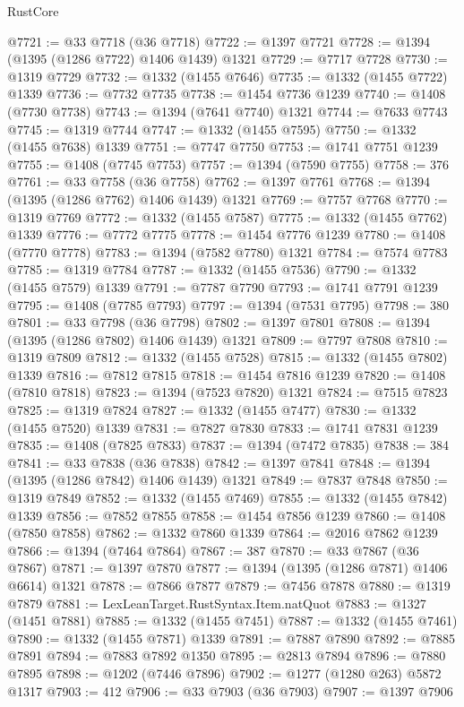 \begin{lexlean}{RustCore}
\begin{coremodule}
@7721 := @33 @7718 (@36 @7718)
@7722 := @1397 @7721
@7728 := @1394 (@1395 (@1286 @7722) @1406 @1439) @1321
@7729 := @7717 @7728
@7730 := @1319 @7729
@7732 := @1332 (@1455 @7646)
@7735 := @1332 (@1455 @7722) @1339
@7736 := @7732 @7735
@7738 := @1454 @7736 @1239
@7740 := @1408 (@7730 @7738)
@7743 := @1394 (@7641 @7740) @1321
@7744 := @7633 @7743
@7745 := @1319 @7744
@7747 := @1332 (@1455 @7595)
@7750 := @1332 (@1455 @7638) @1339
@7751 := @7747 @7750
@7753 := @1741 @7751 @1239
@7755 := @1408 (@7745 @7753)
@7757 := @1394 (@7590 @7755)
@7758 := 376
@7761 := @33 @7758 (@36 @7758)
@7762 := @1397 @7761
@7768 := @1394 (@1395 (@1286 @7762) @1406 @1439) @1321
@7769 := @7757 @7768
@7770 := @1319 @7769
@7772 := @1332 (@1455 @7587)
@7775 := @1332 (@1455 @7762) @1339
@7776 := @7772 @7775
@7778 := @1454 @7776 @1239
@7780 := @1408 (@7770 @7778)
@7783 := @1394 (@7582 @7780) @1321
@7784 := @7574 @7783
@7785 := @1319 @7784
@7787 := @1332 (@1455 @7536)
@7790 := @1332 (@1455 @7579) @1339
@7791 := @7787 @7790
@7793 := @1741 @7791 @1239
@7795 := @1408 (@7785 @7793)
@7797 := @1394 (@7531 @7795)
@7798 := 380
@7801 := @33 @7798 (@36 @7798)
@7802 := @1397 @7801
@7808 := @1394 (@1395 (@1286 @7802) @1406 @1439) @1321
@7809 := @7797 @7808
@7810 := @1319 @7809
@7812 := @1332 (@1455 @7528)
@7815 := @1332 (@1455 @7802) @1339
@7816 := @7812 @7815
@7818 := @1454 @7816 @1239
@7820 := @1408 (@7810 @7818)
@7823 := @1394 (@7523 @7820) @1321
@7824 := @7515 @7823
@7825 := @1319 @7824
@7827 := @1332 (@1455 @7477)
@7830 := @1332 (@1455 @7520) @1339
@7831 := @7827 @7830
@7833 := @1741 @7831 @1239
@7835 := @1408 (@7825 @7833)
@7837 := @1394 (@7472 @7835)
@7838 := 384
@7841 := @33 @7838 (@36 @7838)
@7842 := @1397 @7841
@7848 := @1394 (@1395 (@1286 @7842) @1406 @1439) @1321
@7849 := @7837 @7848
@7850 := @1319 @7849
@7852 := @1332 (@1455 @7469)
@7855 := @1332 (@1455 @7842) @1339
@7856 := @7852 @7855
@7858 := @1454 @7856 @1239
@7860 := @1408 (@7850 @7858)
@7862 := @1332 @7860 @1339
@7864 := @2016 @7862 @1239
@7866 := @1394 (@7464 @7864)
@7867 := 387
@7870 := @33 @7867 (@36 @7867)
@7871 := @1397 @7870
@7877 := @1394 (@1395 (@1286 @7871) @1406 @6614) @1321
@7878 := @7866 @7877
@7879 := @7456 @7878
@7880 := @1319 @7879
@7881 := LexLeanTarget.RustSyntax.Item.natQuot
@7883 := @1327 (@1451 @7881)
@7885 := @1332 (@1455 @7451)
@7887 := @1332 (@1455 @7461)
@7890 := @1332 (@1455 @7871) @1339
@7891 := @7887 @7890
@7892 := @7885 @7891
@7894 := @7883 @7892 @1350
@7895 := @2813 @7894
@7896 := @7880 @7895
@7898 := @1202 (@7446 @7896)
@7902 := @1277 (@1280 @263) @5872 @1317
@7903 := 412
@7906 := @33 @7903 (@36 @7903)
@7907 := @1397 @7906

\end{coremodule}
\end{lexlean}
